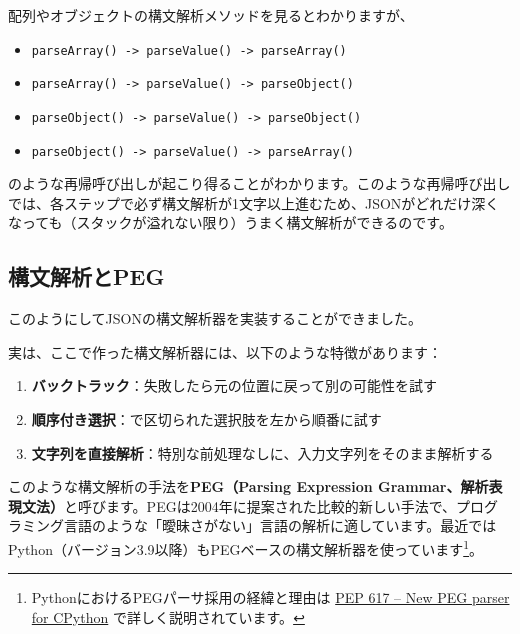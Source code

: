 配列やオブジェクトの構文解析メソッドを見るとわかりますが、

\begin{itemize}
\tightlist
\item
  \texttt{parseArray()\ -\textgreater{}\ parseValue()\ -\textgreater{}\ parseArray()}
\item
  \texttt{parseArray()\ -\textgreater{}\ parseValue()\ -\textgreater{}\ parseObject()}
\item
  \texttt{parseObject()\ -\textgreater{}\ parseValue()\ -\textgreater{}\ parseObject()}
\item
  \texttt{parseObject()\ -\textgreater{}\ parseValue()\ -\textgreater{}\ parseArray()}
\end{itemize}

のような再帰呼び出しが起こり得ることがわかります。このような再帰呼び出しでは、各ステップで必ず構文解析が1文字以上進むため、JSONがどれだけ深くなっても（スタックが溢れない限り）うまく構文解析ができるのです。

\hypertarget{chapter3-ux69cbux6587ux89e3ux6790ux3068peg}{%
\subsection{構文解析とPEG}\label{chapter3-ux69cbux6587ux89e3ux6790ux3068peg}}

このようにしてJSONの構文解析器を実装することができました。

実は、ここで作った構文解析器には、以下のような特徴があります：

\begin{enumerate}
\def\labelenumi{\arabic{enumi}.}
\tightlist
\item
  \textbf{バックトラック}：失敗したら元の位置に戻って別の可能性を試す
\item
  \textbf{順序付き選択}：\texttt{\textbar{}}で区切られた選択肢を左から順番に試す
\item
  \textbf{文字列を直接解析}：特別な前処理なしに、入力文字列をそのまま解析する
\end{enumerate}

このような構文解析の手法を\textbf{PEG（Parsing Expression
Grammar、解析表現文法）}と呼びます。PEGは2004年に提案された比較的新しい手法で、プログラミング言語のような「曖昧さがない」言語の解析に適しています。最近ではPython（バージョン3.9以降）もPEGベースの構文解析器を使っています\footnote{PythonにおけるPEGパーサ採用の経緯と理由は
  \href{https://peps.python.org/pep-0617/}{PEP 617 -- New PEG parser for
  CPython} で詳しく説明されています。}。

